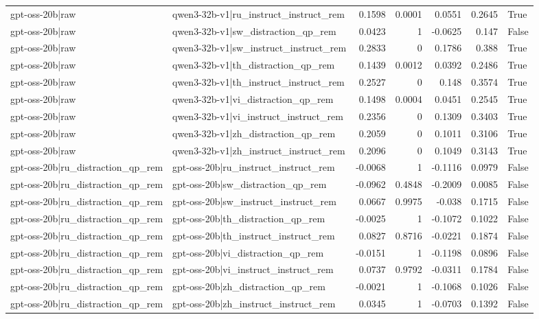\begin{table}
\begin{tabular}{l l r r r r l}
gpt-oss-20b|raw & qwen3-32b-v1|ru_instruct_instruct_rem & 0.1598 & 0.0001 & 0.0551 & 0.2645 & True \\
gpt-oss-20b|raw & qwen3-32b-v1|sw_distraction_qp_rem & 0.0423 & 1 & -0.0625 & 0.147 & False \\
gpt-oss-20b|raw & qwen3-32b-v1|sw_instruct_instruct_rem & 0.2833 & 0 & 0.1786 & 0.388 & True \\
gpt-oss-20b|raw & qwen3-32b-v1|th_distraction_qp_rem & 0.1439 & 0.0012 & 0.0392 & 0.2486 & True \\
gpt-oss-20b|raw & qwen3-32b-v1|th_instruct_instruct_rem & 0.2527 & 0 & 0.148 & 0.3574 & True \\
gpt-oss-20b|raw & qwen3-32b-v1|vi_distraction_qp_rem & 0.1498 & 0.0004 & 0.0451 & 0.2545 & True \\
gpt-oss-20b|raw & qwen3-32b-v1|vi_instruct_instruct_rem & 0.2356 & 0 & 0.1309 & 0.3403 & True \\
gpt-oss-20b|raw & qwen3-32b-v1|zh_distraction_qp_rem & 0.2059 & 0 & 0.1011 & 0.3106 & True \\
gpt-oss-20b|raw & qwen3-32b-v1|zh_instruct_instruct_rem & 0.2096 & 0 & 0.1049 & 0.3143 & True \\
gpt-oss-20b|ru_distraction_qp_rem & gpt-oss-20b|ru_instruct_instruct_rem & -0.0068 & 1 & -0.1116 & 0.0979 & False \\
gpt-oss-20b|ru_distraction_qp_rem & gpt-oss-20b|sw_distraction_qp_rem & -0.0962 & 0.4848 & -0.2009 & 0.0085 & False \\
gpt-oss-20b|ru_distraction_qp_rem & gpt-oss-20b|sw_instruct_instruct_rem & 0.0667 & 0.9975 & -0.038 & 0.1715 & False \\
gpt-oss-20b|ru_distraction_qp_rem & gpt-oss-20b|th_distraction_qp_rem & -0.0025 & 1 & -0.1072 & 0.1022 & False \\
gpt-oss-20b|ru_distraction_qp_rem & gpt-oss-20b|th_instruct_instruct_rem & 0.0827 & 0.8716 & -0.0221 & 0.1874 & False \\
gpt-oss-20b|ru_distraction_qp_rem & gpt-oss-20b|vi_distraction_qp_rem & -0.0151 & 1 & -0.1198 & 0.0896 & False \\
gpt-oss-20b|ru_distraction_qp_rem & gpt-oss-20b|vi_instruct_instruct_rem & 0.0737 & 0.9792 & -0.0311 & 0.1784 & False \\
gpt-oss-20b|ru_distraction_qp_rem & gpt-oss-20b|zh_distraction_qp_rem & -0.0021 & 1 & -0.1068 & 0.1026 & False \\
gpt-oss-20b|ru_distraction_qp_rem & gpt-oss-20b|zh_instruct_instruct_rem & 0.0345 & 1 & -0.0703 & 0.1392 & False \\

\end{tabular}
\end{table}
